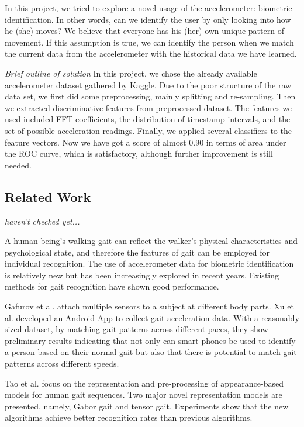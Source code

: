 \documentclass{article} %
\begin{document}
In this project, we tried to explore a novel usage of the accelerometer: biometric identification. In other words, can we identify the user by only looking into how he (she) moves? We believe that everyone has his (her) own unique pattern of movement. If this assumption is true, we can identify the person when we match the current data from the accelerometer with the historical data we have learned.

\emph{Brief outline of solution} In this project, we chose the already available accelerometer dataset gathered by Kaggle. Due to the poor structure of the raw data set, we first did some preprocessing, mainly splitting and re-sampling. Then we extracted discriminative features from preprocessed dataset. The features we used included FFT coefficients, the distribution of timestamp intervals, and the set of possible acceleration readings. Finally, we applied several  classifiers to the feature vectors. Now we have got a score of almost 0.90 in terms of area under the ROC curve, which is satisfactory, although further improvement is still needed.






\subsection{Related Work} \emph{haven't checked yet...}

A human being’s walking gait can reflect the walker’s physical characteristics and psychological state, and therefore the features of gait can be employed for individual recognition. The use of accelerometer data for biometric identification is relatively new but has been increasingly explored in recent years. Existing methods for gait recognition have shown good performance.
 
Gafurov et al. \cite{Gafurov:AIAT2007} attach multiple sensors to a subject at different body parts. Xu et al. \cite{Xu:ICB2012} developed an Android App to collect gait acceleration data. With a reasonably sized dataset, by matching gait patterns across different paces, they show preliminary results indicating that not only can smart phones be used to identify a person based on their normal gait but also that there is potential to match gait patterns across different speeds.

Tao et al.\cite{Tao:ToPAMI2007} focus on the representation and pre-processing of appearance-based models for human gait sequences. Two major novel representation models are presented, namely, Gabor gait and tensor gait. Experiments show that the new algorithms achieve better recognition rates than previous algorithms.
\end{document}

